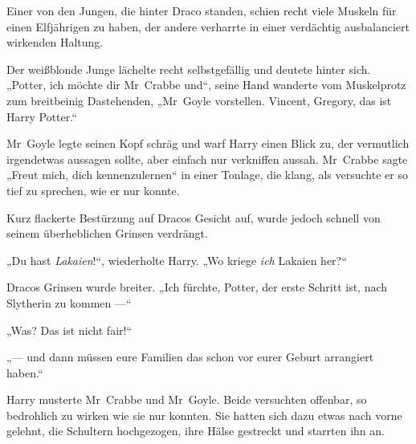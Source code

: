 Einer von den Jungen, die hinter Draco standen, schien recht viele Muskeln für einen Elfjährigen zu haben, der andere verharrte in einer verdächtig ausbalanciert wirkenden Haltung.

Der weißblonde Junge lächelte recht selbstgefällig und deutete hinter sich.
„Potter, ich möchte dir Mr~Crabbe und“, seine Hand wanderte vom Muskelprotz zum breitbeinig Dastehenden,
„Mr~Goyle vorstellen. Vincent, Gregory, das ist Harry Potter.“

Mr~Goyle legte seinen Kopf schräg und warf Harry einen Blick zu, der vermutlich irgendetwas aussagen sollte, aber einfach nur verkniffen aussah. Mr~Crabbe sagte
„Freut mich, dich kennenzulernen“ in einer Tonlage, die klang, als versuchte er so tief zu sprechen, wie er nur konnte.

Kurz flackerte Bestürzung auf Dracos Gesicht auf, wurde jedoch schnell von seinem überheblichen Grinsen verdrängt.

„Du hast \emph{Lakaien}!“, wiederholte Harry.
„Wo kriege \emph{ich} Lakaien her?“

Dracos Grinsen wurde breiter.
„Ich fürchte, Potter, der erste Schritt ist, nach Slytherin zu kommen —“

„Was? Das ist nicht fair!“

„— und dann müssen eure Familien das schon vor eurer Geburt arrangiert haben.“

Harry musterte Mr~Crabbe und Mr~Goyle. Beide versuchten offenbar, so bedrohlich zu wirken wie sie nur konnten. Sie hatten sich dazu etwas nach vorne gelehnt, die Schultern hochgezogen, ihre Hälse gestreckt und starrten ihn an.

